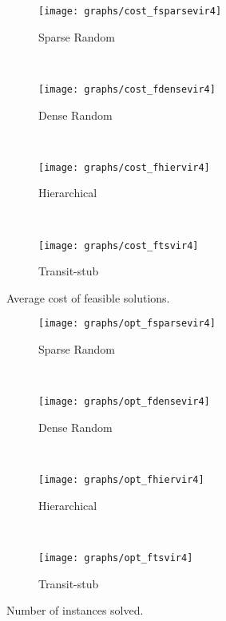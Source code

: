 \documentclass[conference]{IEEEtran}
\begin{document}
\begin{figure*}
        \centering
        \begin{subfigure}[b]{0.40\textwidth}
                \texttt{[image: graphs/cost\_fsparsevir4]}
                \caption{Sparse Random}
                \label{fig:s12}
        \end{subfigure}
        ~
        \begin{subfigure}[b]{0.4\textwidth}
                \texttt{[image: graphs/cost\_fdensevir4]}
                \caption{Dense Random}
                \label{fig:d12}
        \end{subfigure}
        \\ 
        \begin{subfigure}[b]{0.4\textwidth}
                \texttt{[image: graphs/cost\_fhiervir4]}
                \caption{Hierarchical}
                \label{fig:h12}
        \end{subfigure}
        ~
        \begin{subfigure}[b]{0.4\textwidth}
                \texttt{[image: graphs/cost\_ftsvir4]}
                \caption{Transit-stub}
                \label{fig:t12}
        \end{subfigure}
        \caption{Average cost of feasible solutions.}\label{fig:costgraph}
\end{figure*}


\begin{figure*}
        \centering
        \begin{subfigure}[b]{0.40\textwidth}
                \texttt{[image: graphs/opt\_fsparsevir4]}
                \caption{Sparse Random}
                \label{fig:s21}
        \end{subfigure}
        ~
        \begin{subfigure}[b]{0.4\textwidth}
                \texttt{[image: graphs/opt\_fdensevir4]}
                \caption{Dense Random}
                \label{fig:d21}
        \end{subfigure}
        \\
        \begin{subfigure}[b]{0.4\textwidth}
                \texttt{[image: graphs/opt\_fhiervir4]}
                \caption{Hierarchical}
                \label{fig:h21}
        \end{subfigure}
        ~ 
        \begin{subfigure}[b]{0.4\textwidth}
                \texttt{[image: graphs/opt\_ftsvir4]}
                \caption{Transit-stub}
                \label{fig:t21}
        \end{subfigure}
        \caption{Number of instances solved.}\label{fig:optgraph}
\end{figure*}
\end{document}
